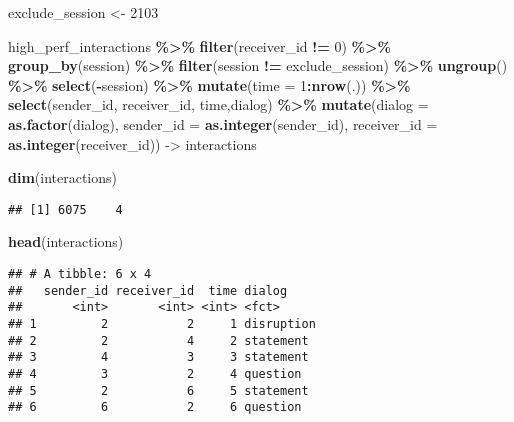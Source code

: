 \documentclass[
]{article}
\newenvironment{Shaded}{\begin{snugshade}}{\end{snugshade}}
\newcommand{\AttributeTok}[1]{\textcolor[rgb]{0.13,0.29,0.53}{#1}}
\newcommand{\DecValTok}[1]{\textcolor[rgb]{0.00,0.00,0.81}{#1}}
\newcommand{\FunctionTok}[1]{\textcolor[rgb]{0.13,0.29,0.53}{\textbf{#1}}}
\newcommand{\NormalTok}[1]{#1}
\newcommand{\OtherTok}[1]{\textcolor[rgb]{0.56,0.35,0.01}{#1}}
\newcommand{\SpecialCharTok}[1]{\textcolor[rgb]{0.81,0.36,0.00}{\textbf{#1}}}
\begin{document}
\begin{Shaded}
\begin{Highlighting}[]
\NormalTok{exclude\_session }\OtherTok{\textless{}{-}} \DecValTok{2103}

\NormalTok{high\_perf\_interactions }\SpecialCharTok{\%\textgreater{}\%} \FunctionTok{filter}\NormalTok{(receiver\_id }\SpecialCharTok{!=} \DecValTok{0}\NormalTok{) }\SpecialCharTok{\%\textgreater{}\%} \FunctionTok{group\_by}\NormalTok{(session) }\SpecialCharTok{\%\textgreater{}\%} \FunctionTok{filter}\NormalTok{(session }\SpecialCharTok{!=}\NormalTok{ exclude\_session) }\SpecialCharTok{\%\textgreater{}\%} \FunctionTok{ungroup}\NormalTok{() }\SpecialCharTok{\%\textgreater{}\%} \FunctionTok{select}\NormalTok{(}\SpecialCharTok{{-}}\NormalTok{session) }\SpecialCharTok{\%\textgreater{}\%} \FunctionTok{mutate}\NormalTok{(}\AttributeTok{time =} \DecValTok{1}\SpecialCharTok{:}\FunctionTok{nrow}\NormalTok{(.))  }\SpecialCharTok{\%\textgreater{}\%} \FunctionTok{select}\NormalTok{(sender\_id, receiver\_id, time,dialog)  }\SpecialCharTok{\%\textgreater{}\%} \FunctionTok{mutate}\NormalTok{(}\AttributeTok{dialog =} \FunctionTok{as.factor}\NormalTok{(dialog), }\AttributeTok{sender\_id =} \FunctionTok{as.integer}\NormalTok{(sender\_id), }\AttributeTok{receiver\_id =} \FunctionTok{as.integer}\NormalTok{(receiver\_id)) }\OtherTok{{-}\textgreater{}}\NormalTok{ interactions}

\FunctionTok{dim}\NormalTok{(interactions)}
\end{Highlighting}
\end{Shaded}

\begin{verbatim}
## [1] 6075    4
\end{verbatim}

\begin{Shaded}
\begin{Highlighting}[]
\FunctionTok{head}\NormalTok{(interactions)}
\end{Highlighting}
\end{Shaded}

\begin{verbatim}
## # A tibble: 6 x 4
##   sender_id receiver_id  time dialog    
##       <int>       <int> <int> <fct>     
## 1         2           2     1 disruption
## 2         2           4     2 statement 
## 3         4           3     3 statement 
## 4         3           2     4 question  
## 5         2           6     5 statement 
## 6         6           2     6 question
\end{verbatim}
\end{document}
